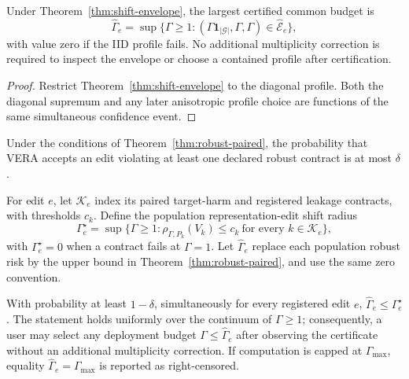 \begin{corollary}
\label{cor:common-radius}
Under Theorem~\ref{thm:shift-envelope}, the largest certified common budget is
\begin{equation}
 \widehat\Gamma_e=\sup\{\Gamma\geq1:
 (\Gamma\mathbf 1_{|\mathcal G|},\Gamma,\Gamma)
 \in\widehat{\mathcal E}_e\},
\end{equation}
with value zero if the IID profile fails. No additional multiplicity
correction is required to inspect the envelope or choose a contained profile
after certification.
\end{corollary}

\begin{proof}
Restrict Theorem~\ref{thm:shift-envelope} to the diagonal profile. Both the
diagonal supremum and any later anisotropic profile choice are functions of the
same simultaneous confidence event.
\end{proof}

\begin{corollary}
Under the conditions of Theorem~\ref{thm:robust-paired}, the probability that
VERA accepts an edit violating at least one declared robust contract is at most
$\delta$.
\end{corollary}

For edit $e$, let $\mathcal{K}_e$ index its paired target-harm and registered
leakage contracts, with thresholds $c_k$. Define the population representation-edit shift
radius
\begin{equation}
 \Gamma_e^\star=\sup\{\Gamma\geq1:
 \rho_{\Gamma,P_k}(V_k)\leq c_k\ \text{for every }k\in\mathcal{K}_e\},
\end{equation}
with $\Gamma_e^\star=0$ when a contract fails at $\Gamma=1$. Let
$\widehat\Gamma_e$ replace each population robust risk by the upper bound in
Theorem~\ref{thm:robust-paired}, and use the same zero convention.

\begin{theorem}
\label{thm:shift-radius}
With probability at least $1-\delta$, simultaneously for every registered edit
$e$, $\widehat\Gamma_e\leq\Gamma_e^\star$. The statement holds uniformly over
the continuum of $\Gamma\geq1$; consequently, a user may select any deployment
budget $\Gamma\leq\widehat\Gamma_e$ after observing the certificate without an
additional multiplicity correction. If computation is capped at
$\Gamma_{\max}$, equality $\widehat\Gamma_e=\Gamma_{\max}$ is reported as
right-censored.
\end{theorem}

